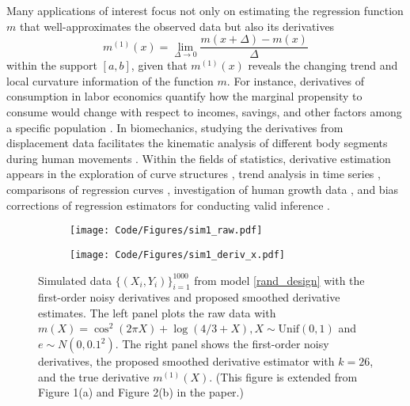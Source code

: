 \documentclass{uwstat572}
\theoremstyle{definition}
\theoremstyle{theorem}
\begin{document}
Many applications of interest focus not only on estimating the regression function $m$ that well-approximates the observed data but also its derivatives
\begin{equation}
\label{deriv_def}
m^{(1)}(x) =\lim\limits_{\Delta\to 0} \frac{m(x+\Delta) - m(x)}{\Delta}
\end{equation}
within the support $[a,b]$, given that $m^{(1)}(x)$ reveals the changing trend and local curvature information of the function $m$. For instance, derivatives of consumption in labor economics quantify how the marginal propensity to consume \citep{haavelmo1947methods} would change with respect to incomes, savings, and other factors among a specific population \citep{dang2021smoothed,dang2022machine}. In biomechanics, studying the derivatives from displacement data facilitates the kinematic analysis of different body segments during human movements \citep{woltring1985optimal}. Within the fields of statistics, derivative estimation appears in the exploration of curve structures \citep{chaudhuri1999sizer,gijbels2005data}, trend analysis in time series \citep{rondonotti2007sizer}, comparisons of regression curves \citep{park2008sizer}, investigation of human growth data \citep{Mller1988NonparametricRA,ramsay2002applied}, and bias corrections of regression estimators for conducting valid inference \citep{eubank1993confidence,xia1998bias,calonico2018effect,cheng2019nonparametric}.

\begin{figure}
	\captionsetup[subfigure]{justification=centering}
	\begin{subfigure}[t]{0.49\linewidth}
		\centering
		\texttt{[image: Code/Figures/sim1\_raw.pdf]}
	\end{subfigure}
	\hfil
	\begin{subfigure}[t]{0.49\linewidth}
		\centering
		\texttt{[image: Code/Figures/sim1\_deriv\_x.pdf]}
	\end{subfigure}
	\caption{Simulated data $\{(X_i,Y_i)\}_{i=1}^{1000}$ from model \eqref{rand_design} with the first-order noisy derivatives and proposed smoothed derivative estimates. The left panel plots the raw data with $m(X) = \cos^2(2\pi X) + \log(4/3 +X), X\sim \mathrm{Unif}(0,1)$ and $e\sim N(0,0.1^2)$. The right panel shows the first-order noisy derivatives, the proposed smoothed derivative estimator with $k=26$, and the true derivative $m^{(1)}(X)$. (This figure is extended from Figure 1(a) and Figure 2(b) in the paper.)}
	\label{fig:sim1}
\end{figure}
\end{document}
